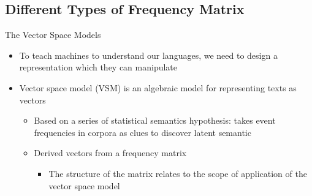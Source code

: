 

\subsection{Different Types of Frequency Matrix}

\begin{frame}{The Vector Space Models}
	\begin{itemize}
	\item To teach machines to understand our languages, we need to design a representation which they can manipulate
	\item Vector space model (VSM) is an algebraic model for \alert{representing texts as vectors}
		\begin{itemize}
		\item Based on a series of statistical semantics hypothesis: takes event frequencies in corpora as clues to discover latent semantic
		\item Derived vectors from a \alert{frequency matrix}
			\begin{itemize}
			\item The structure of the matrix relates to the scope of application of the vector space model\cite{Turney2010vsm}
			\end{itemize}	
		\end{itemize}
	\end{itemize}
\end{frame}

